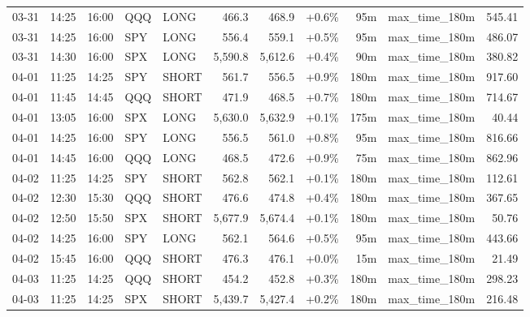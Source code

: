 \documentclass[11pt,a4paper,twoside]{article}
\begin{document}
\begin{center}
\begin{longtable}{>{\color{txtmain}}l l l l l r r r r >{\color{txtmain}}l r}
03-31 & 14:25 & 16:00 & QQQ & LONG & 466.3 & 468.9 & \textcolor{wingreen}{+0.6\%} & 95m & max\_time\_180m & \textcolor{wingreen}{545.41} \\
03-31 & 14:25 & 16:00 & SPY & LONG & 556.4 & 559.1 & \textcolor{wingreen}{+0.5\%} & 95m & max\_time\_180m & \textcolor{wingreen}{486.07} \\
03-31 & 14:30 & 16:00 & SPX & LONG & 5,590.8 & 5,612.6 & \textcolor{wingreen}{+0.4\%} & 90m & max\_time\_180m & \textcolor{wingreen}{380.82} \\
04-01 & 11:25 & 14:25 & SPY & SHORT & 561.7 & 556.5 & \textcolor{wingreen}{+0.9\%} & 180m & max\_time\_180m & \textcolor{wingreen}{917.60} \\
04-01 & 11:45 & 14:45 & QQQ & SHORT & 471.9 & 468.5 & \textcolor{wingreen}{+0.7\%} & 180m & max\_time\_180m & \textcolor{wingreen}{714.67} \\
04-01 & 13:05 & 16:00 & SPX & LONG & 5,630.0 & 5,632.9 & \textcolor{wingreen}{+0.1\%} & 175m & max\_time\_180m & \textcolor{wingreen}{40.44} \\
04-01 & 14:25 & 16:00 & SPY & LONG & 556.5 & 561.0 & \textcolor{wingreen}{+0.8\%} & 95m & max\_time\_180m & \textcolor{wingreen}{816.66} \\
04-01 & 14:45 & 16:00 & QQQ & LONG & 468.5 & 472.6 & \textcolor{wingreen}{+0.9\%} & 75m & max\_time\_180m & \textcolor{wingreen}{862.96} \\
04-02 & 11:25 & 14:25 & SPY & SHORT & 562.8 & 562.1 & \textcolor{wingreen}{+0.1\%} & 180m & max\_time\_180m & \textcolor{wingreen}{112.61} \\
04-02 & 12:30 & 15:30 & QQQ & SHORT & 476.6 & 474.8 & \textcolor{wingreen}{+0.4\%} & 180m & max\_time\_180m & \textcolor{wingreen}{367.65} \\
04-02 & 12:50 & 15:50 & SPX & SHORT & 5,677.9 & 5,674.4 & \textcolor{wingreen}{+0.1\%} & 180m & max\_time\_180m & \textcolor{wingreen}{50.76} \\
04-02 & 14:25 & 16:00 & SPY & LONG & 562.1 & 564.6 & \textcolor{wingreen}{+0.5\%} & 95m & max\_time\_180m & \textcolor{wingreen}{443.66} \\
04-02 & 15:45 & 16:00 & QQQ & SHORT & 476.3 & 476.1 & \textcolor{wingreen}{+0.0\%} & 15m & max\_time\_180m & \textcolor{wingreen}{21.49} \\
04-03 & 11:25 & 14:25 & QQQ & SHORT & 454.2 & 452.8 & \textcolor{wingreen}{+0.3\%} & 180m & max\_time\_180m & \textcolor{wingreen}{298.23} \\
04-03 & 11:25 & 14:25 & SPX & SHORT & 5,439.7 & 5,427.4 & \textcolor{wingreen}{+0.2\%} & 180m & max\_time\_180m & \textcolor{wingreen}{216.48} \\

\end{longtable}
\end{center}
\end{document}
